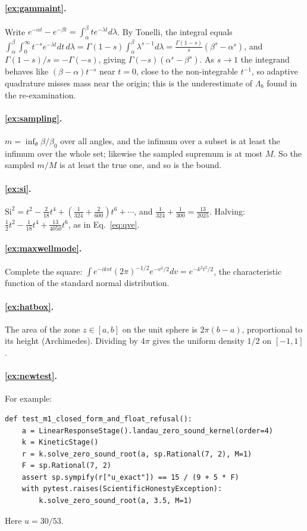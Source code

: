 \documentclass[11pt,a4paper,openany]{book}
\theoremstyle{definition}
\theoremstyle{plain}
\begin{document}
\paragraph{\ref{ex:gammaint}.} Write $e^{-\alpha t}-e^{-\beta t}=\int_\alpha^\beta te^{-\lambda t}
d\lambda$. By Tonelli, the integral equals $\int_\alpha^\beta\int_0^\infty t^{-s}e^{-\lambda t}
dt\,d\lambda=\Gamma(1-s)\int_\alpha^\beta\lambda^{s-1}d\lambda=\frac{\Gamma(1-s)}{s}(\beta^s-
\alpha^s)$, and $\Gamma(1-s)/s=-\Gamma(-s)$, giving $\Gamma(-s)(\alpha^s-\beta^s)$. As $s\to1$
the integrand behaves like $(\beta-\alpha)t^{-s}$ near $t=0$, close to the non-integrable $t^{-1}$,
so adaptive quadrature misses mass near the origin; this is the underestimate of $\Lambda_b$
found in the re-examination.

\paragraph{\ref{ex:sampling}.} $m=\inf_\theta\beta/\beta_0$ over all angles, and the infimum over a
subset is at least the infimum over the whole set; likewise the sampled supremum is at most $M$.
So the sampled $m/M$ is at least the true one, and so is the bound.

\paragraph{\ref{ex:si}.} $\mathrm{Si}^2=t^2-\frac{2}{18}t^4+\left(\frac1{324}+\frac2{600}\right)t^6
+\cdots$, and $\frac1{324}+\frac1{300}=\frac{13}{2025}$. Halving: $\frac12t^2-\frac1{18}t^4
+\frac{13}{4050}t^6$, as in Eq.~\eqref{eq:qve}.

\paragraph{\ref{ex:maxwellmode}.} Complete the square: $\int e^{-ikvt}(2\pi)^{-1/2}e^{-v^2/2}dv
=e^{-k^2t^2/2}$, the characteristic function of the standard normal distribution.

\paragraph{\ref{ex:hatbox}.} The area of the zone $z\in[a,b]$ on the unit sphere is $2\pi(b-a)$,
proportional to its height (Archimedes). Dividing by $4\pi$ gives the uniform density $1/2$ on
$[-1,1]$.

\paragraph{\ref{ex:newtest}.} For example:
\begin{verbatim}
def test_m1_closed_form_and_float_refusal():
    a = LinearResponseStage().landau_zero_sound_kernel(order=4)
    k = KineticStage()
    r = k.solve_zero_sound_root(a, sp.Rational(7, 2), M=1)
    F = sp.Rational(7, 2)
    assert sp.sympify(r["u_exact"]) == 15 / (9 + 5 * F)
    with pytest.raises(ScientificHonestyException):
        k.solve_zero_sound_root(a, 3.5, M=1)
\end{verbatim}
Here $u=30/53$.
\end{document}
